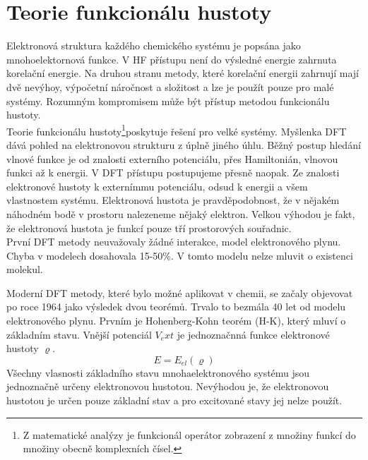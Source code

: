 \documentclass[
  digital, %
  table,   %
  lof,     %
  lot,     %
]{fithesis3}
\begin{document}
\section{Teorie funkcionálu hustoty}
Elektronová struktura každého chemického systému je popsána jako mnohoelektornová funkce. V HF přístupu není do výsledné energie zahrnuta korelační energie. Na druhou stranu metody, které korelační energii zahrnují mají dvě nevýhoy, výpočetní náročnost a složitost a lze je použít pouze pro malé systémy. Rozumným kompromisem může být přístup metodou funkcionálu hustoty. \\

Teorie funkcionálu hustoty\footnote{Z matematické analýzy je funkcionál operátor zobrazení z množiny funkcí do množiny obecně komplexních čísel.}poskytuje řešení pro velké systémy. Myšlenka DFT dává pohled na elektronovou strukturu z úplně jiného úhlu. Běžný postup hledání vlnové funkce je od znalosti externího potenciálu, přes Hamiltonián, vlnovou funkci až k energii. V DFT přístupu postupujeme přesně naopak. Ze znalosti elektronové hustoty k externímmu potenciálu, odsud k energii a všem vlastnostem systému. Elektronová hustota je pravděpodobnost, že v nějakém náhodném bodě v prostoru nalezeneme nějaký elektron. Velkou výhodou je fakt, že elektronová hustota je funkcí pouze tří prostorových souřadnic. \\
První DFT metody neuvažovaly žádné interakce, model elektronového plynu. Chyba v modelech dosahovala 15-50\%. V tomto modelu nelze mluvit o existenci molekul.\cite{jensen2007introduction}

Moderní DFT metody, které bylo možné aplikovat v chemii, se začaly objevovat po roce 1964 jako výsledek dvou teorémů. Trvalo to bezmála 40 let od modelu elektronového plynu. Prvním je Hohenberg-Kohn teorém (H-K), který mluví o základním stavu. Vnější potenciál  $V_ext$ je jednoznačnná funkce elektronové hustoty $\varrho$.
\begin{equation}
E = E_{el} (\varrho)
\end{equation}
 Všechny vlasnosti základního stavu mnohaelektronového systému jsou jednoznačně určeny elektronovou hustotou. Nevýhodou je, že elektronovou hustotou je určen pouze základní stav a pro excitované stavy jej nelze použít.
\end{document}
